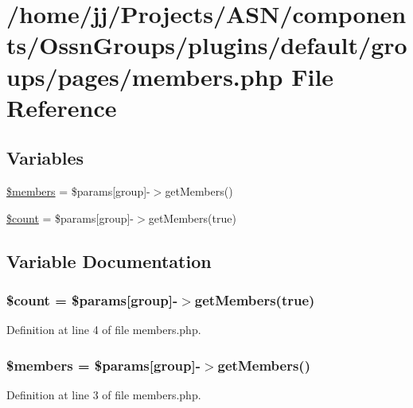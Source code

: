 \hypertarget{members_8php}{}\section{/home/jj/\+Projects/\+A\+S\+N/components/\+Ossn\+Groups/plugins/default/groups/pages/members.php File Reference}
\label{members_8php}
\subsection*{Variables}
\begin{DoxyCompactItemize}
\item 
\hyperlink{members_8php_ae2118b67db555e724032d6b8c057e272}{\$members} = \$params\mbox{[}\textquotesingle{}group\textquotesingle{}\mbox{]}-\/$>$get\+Members()
\item 
\hyperlink{members_8php_af789423037bbc89dc7c850e761177570}{\$count} = \$params\mbox{[}\textquotesingle{}group\textquotesingle{}\mbox{]}-\/$>$get\+Members(true)
\end{DoxyCompactItemize}


\subsection{Variable Documentation}
\subsubsection[{\texorpdfstring{\$count}{$count}}]{\setlength{\rightskip}{0pt plus 5cm}\${\bf count} = \$params\mbox{[}\textquotesingle{}group\textquotesingle{}\mbox{]}-\/$>$get\+Members(true)}\hypertarget{members_8php_af789423037bbc89dc7c850e761177570}{}\label{members_8php_af789423037bbc89dc7c850e761177570}


Definition at line 4 of file members.\+php.

\subsubsection[{\texorpdfstring{\$members}{$members}}]{\setlength{\rightskip}{0pt plus 5cm}\$members = \$params\mbox{[}\textquotesingle{}group\textquotesingle{}\mbox{]}-\/$>$get\+Members()}\hypertarget{members_8php_ae2118b67db555e724032d6b8c057e272}{}\label{members_8php_ae2118b67db555e724032d6b8c057e272}


Definition at line 3 of file members.\+php.

